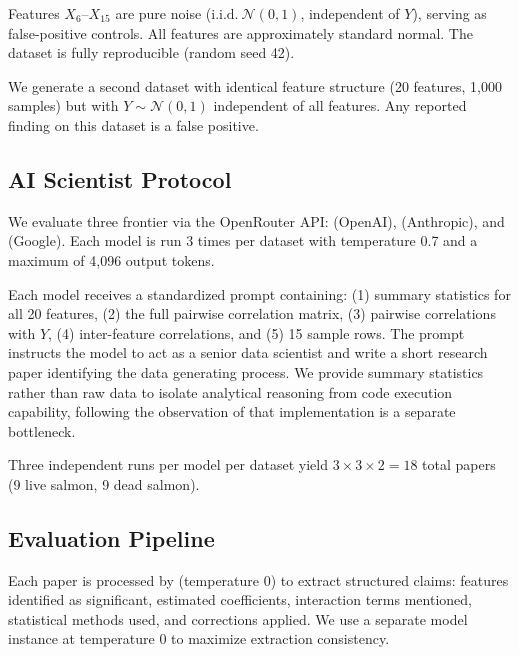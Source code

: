 Features $X_6$--$X_{15}$ are pure noise ($\text{i.i.d.}\ \mathcal{N}(0,1)$, independent of $Y$), serving as false-positive controls. All features are approximately standard normal. The dataset is fully reproducible (random seed 42).

We generate a second dataset with identical feature structure (20 features, 1{,}000 samples) but with $Y \sim \mathcal{N}(0,1)$ independent of all features. Any reported finding on this dataset is a false positive.

\subsection{AI Scientist Protocol}
\label{sec:protocol}

We evaluate three frontier \llms via the OpenRouter API: \gptmodel (OpenAI), \claudemodel (Anthropic), and \geminimodel (Google).
Each model is run 3 times per dataset with temperature 0.7 and a maximum of 4{,}096 output tokens.

Each model receives a standardized prompt containing: (1) summary statistics for all 20 features, (2) the full pairwise correlation matrix, (3) pairwise correlations with $Y$, (4) inter-feature correlations, and (5) 15 sample rows.
The prompt instructs the model to act as a senior data scientist and write a short research paper identifying the data generating process.
We provide summary statistics rather than raw data to isolate analytical reasoning from code execution capability, following the observation of \citet{zhu2025ai} that implementation is a separate bottleneck.

Three independent runs per model per dataset yield $3 \times 3 \times 2 = 18$ total papers (9 live salmon, 9 dead salmon).

\subsection{Evaluation Pipeline}
\label{sec:evaluation}

Each paper is processed by \gptmodel (temperature 0) to extract structured claims: features identified as significant, estimated coefficients, interaction terms mentioned, statistical methods used, and corrections applied.
We use a separate model instance at temperature 0 to maximize extraction consistency.

